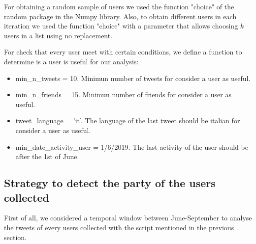 \documentclass[a4paper,10pt]{article}
\begin{document}
For obtaining a random sample of users we used the function "choice" of the random package in the Numpy library. Also, to obtain different users in each iteration we used the function "choice" with a parameter that allows choosing $k$ users in a list using no replacement.

For check that every user meet with certain conditions, we define a function to determine is a user is useful for our analysis:

\begin{itemize}
 \item   min\_n\_tweets = 10. Minimun number of tweets for consider a user as useful. 
 
 \item   min\_n\_friends = 15.  Minimun number of friends for consider a user as useful. 
 
 \item   tweet\_language = 'it'. The language of the last tweet should be italian for consider a user as useful. 
 
 \item   min\_date\_activity\_user = 1/6/2019. The last activity of the user should be after the 1st of June.
\end{itemize}


 
 
 
 
 


\subsection{Strategy to detect the party of the users collected}

First of all, we considered a temporal window between June-September to analyse the tweets of every users collected with the script mentioned in the previous section.



\end{document}

